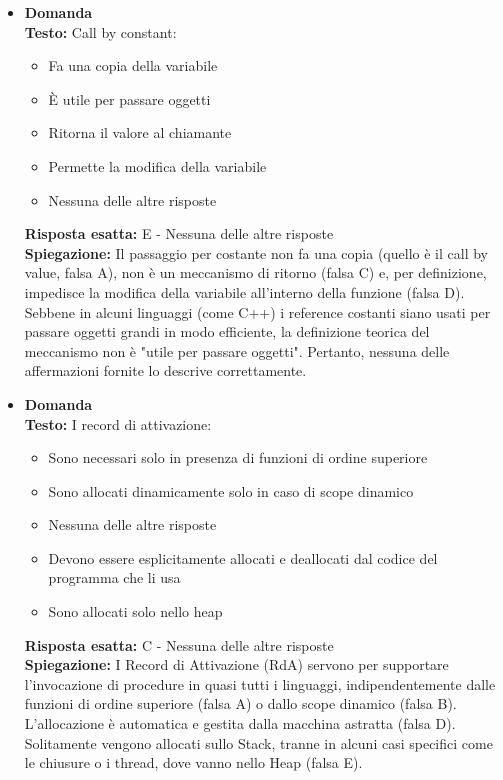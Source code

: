 \documentclass[12pt, a4paper]{article}
\newcounter{domandateoria}
\begin{document}
\begin{itemize}
    \item {}\textbf{Domanda \thedomandateoria} \\
    \textbf{Testo:} Call by constant:
    \begin{itemize}
        \item[A)] Fa una copia della variabile
        \item[B)] È utile per passare oggetti
        \item[C)] Ritorna il valore al chiamante
        \item[D)] Permette la modifica della variabile
        \item[E)] Nessuna delle altre risposte
    \end{itemize}
    \textbf{Risposta esatta:} E - Nessuna delle altre risposte \\
    \textbf{Spiegazione:} Il passaggio per costante non fa una copia (quello è il call by value, falsa A), non è un meccanismo di ritorno (falsa C) e, per definizione, impedisce la modifica della variabile all'interno della funzione (falsa D). Sebbene in alcuni linguaggi (come C++) i reference costanti siano usati per passare oggetti grandi in modo efficiente, la definizione teorica del meccanismo non è "utile per passare oggetti". Pertanto, nessuna delle affermazioni fornite lo descrive correttamente.
    \vspace{0.3cm}

    \item {}\textbf{Domanda \thedomandateoria} \\
    \textbf{Testo:} I record di attivazione:
    \begin{itemize}
        \item[A)] Sono necessari solo in presenza di funzioni di ordine superiore
        \item[B)] Sono allocati dinamicamente solo in caso di scope dinamico
        \item[C)] Nessuna delle altre risposte
        \item[D)] Devono essere esplicitamente allocati e deallocati dal codice del programma che li usa
        \item[E)] Sono allocati solo nello heap
    \end{itemize}
    \textbf{Risposta esatta:} C - Nessuna delle altre risposte \\
    \textbf{Spiegazione:} I Record di Attivazione (RdA) servono per supportare l'invocazione di procedure in quasi tutti i linguaggi, indipendentemente dalle funzioni di ordine superiore (falsa A) o dallo scope dinamico (falsa B). L'allocazione è automatica e gestita dalla macchina astratta (falsa D). Solitamente vengono allocati sullo Stack, tranne in alcuni casi specifici come le chiusure o i thread, dove vanno nello Heap (falsa E).
    \vspace{0.3cm}


\end{itemize}
\end{document}
